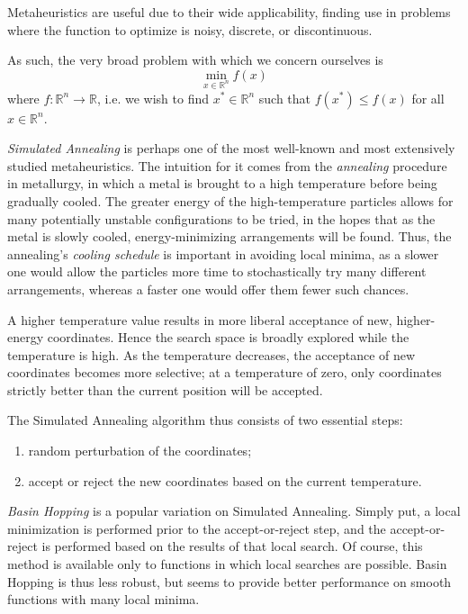 \documentclass[12pt]{article}
\begin{document}
Metaheuristics are useful due to their wide applicability, finding use in
problems where the function to optimize is noisy, discrete, or
discontinuous.

As such, the very broad problem with which we concern ourselves is
$$
\min_{x \in \mathbb{R}^n} f(x)
$$
where $f : \mathbb{R}^n \to \mathbb{R}$,
i.e. we wish to find $x^* \in \mathbb{R}^n$
such that $f(x^*) \leq f(x)$ for all $x \in \mathbb{R}^n$.

\emph{Simulated Annealing}\cite{kirkpatrick1983} is perhaps one of the most
well-known and most extensively studied metaheuristics.
The intuition for it comes from the \emph{annealing} procedure in
metallurgy, in which a metal is brought to a high temperature before being
gradually cooled.
The greater energy of the high-temperature particles allows for many
potentially unstable configurations to be tried, in the hopes that as the
metal is slowly cooled, energy-minimizing arrangements will be found.
Thus, the annealing's \emph{cooling schedule} is important in avoiding
local minima, as a slower one would allow the particles more time to
stochastically try many different arrangements, whereas a faster one would
offer them fewer such chances.

A higher temperature value results in more liberal acceptance of new,
higher-energy coordinates.
Hence the search space is broadly explored while the temperature is high.
As the temperature decreases, the acceptance of new coordinates becomes
more selective; at a temperature of zero, only coordinates strictly better
than the current position will be accepted.

The Simulated Annealing algorithm thus consists of two essential steps:
\begin{enumerate}
    \item random perturbation of the coordinates;
    \item accept or reject the new coordinates based on the current
        temperature.
\end{enumerate}

\emph{Basin Hopping}\cite{wales1997} is a popular variation on Simulated
Annealing.
Simply put, a local minimization is performed prior to the accept-or-reject
step, and the accept-or-reject is performed based on the results of that
local search.
Of course, this method is available only to functions in which local
searches are possible.
Basin Hopping is thus less robust, but seems to provide better performance
on smooth functions with many local minima.
\end{document}
